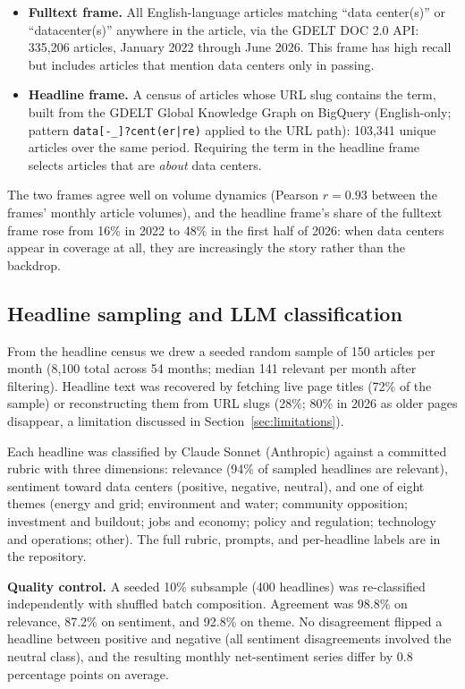\documentclass[11pt]{article}
\begin{document}
\begin{itemize}
\item \textbf{Fulltext frame.} All English-language articles matching
``data center(s)'' or ``datacenter(s)'' anywhere in the article, via the
GDELT DOC 2.0 API: 335,206 articles, January 2022 through June 2026. This
frame has high recall but includes articles that mention data centers only
in passing.
\item \textbf{Headline frame.} A census of articles whose URL slug
contains the term, built from the GDELT Global Knowledge Graph on BigQuery
(English-only; pattern \texttt{data[-\_]?cent(er|re)} applied to the URL
path): 103,341 unique articles over the same period. Requiring the term in
the headline frame selects articles that are \emph{about} data centers.
\end{itemize}

The two frames agree well on volume dynamics (Pearson $r=0.93$ between the
frames' monthly article volumes), and the headline frame's share of the fulltext frame rose from
16\% in 2022 to 48\% in the first half of 2026: when data centers appear in
coverage at all, they are increasingly the story rather than the backdrop.

\subsection{Headline sampling and LLM classification}

From the headline census we drew a seeded random sample of 150 articles per
month (8,100 total across 54 months; median 141 relevant per month after
filtering). Headline text was recovered by fetching live page titles (72\%
of the sample) or reconstructing them from URL slugs (28\%; 80\% in 2026 as
older pages disappear, a limitation discussed in
Section~\ref{sec:limitations}).

Each headline was classified by Claude Sonnet (Anthropic) \cite{claude}
against a committed rubric with three dimensions: relevance (94\% of sampled
headlines are relevant), sentiment toward data centers (positive, negative,
neutral), and one of eight themes (energy and grid; environment and water;
community opposition; investment and buildout; jobs and economy; policy and
regulation; technology and operations; other). The full rubric, prompts, and
per-headline labels are in the repository.

\textbf{Quality control.} A seeded 10\% subsample (400 headlines) was
re-classified independently with shuffled batch composition. Agreement was
98.8\% on relevance, 87.2\% on sentiment, and 92.8\% on theme. No
disagreement flipped a headline between positive and negative (all sentiment
disagreements involved the neutral class), and the resulting monthly
net-sentiment series differ by 0.8 percentage points on average.
\end{document}
